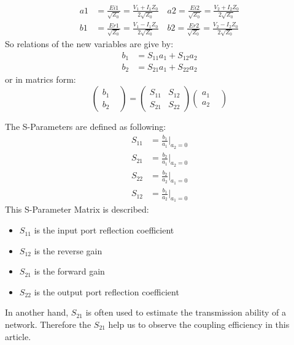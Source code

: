 \begin{align} 
a1&=\frac{Ei1}{\sqrt{Z_{0}}}=\frac{V_{1}+I_{1}Z_{0}}{2\sqrt{Z_{0}}} \quad a2=\frac{Ei2}{\sqrt{Z_{0}}}=\frac{V_{2}+I_{2}Z_{0}}{2\sqrt{Z_{0}}} \\
b1&=\frac{Er1}{\sqrt{Z_{0}}}=\frac{V_{1}-I_{1}Z_{0}}{2\sqrt{Z_{0}}}  \quad b2=\frac{Er2}{\sqrt{Z_{0}}}=\frac{V_{2}-I_{2}Z_{0}}{2\sqrt{Z_{0}}}
\end{align}
So relations of the new variables are give by:
\begin{align}
b_{1}&=S_{11}a_{1}+S_{12}a_{2}\\
b_{2}&=S_{21}a_{1}+S_{22}a_{2}
\end{align}
or in matrics form:
\begin{equation}
		\begin{pmatrix}
			b_{1}&\\
			b_{2}&
		\end{pmatrix}
	=	
		\begin{pmatrix}
			S_{11}&S_{12}\\
			S_{21}&S_{22}
		\end{pmatrix}
		\begin{pmatrix}
			a_{1}&\\
			a_{2}&
		\end{pmatrix}
\label{eq:s_matrix}
\end{equation}

The S-Parameters are defined as following:
\begin{align}
S_{11}&=\frac{b_{1}}{a_{1}}|_{a_{2}=0}\\
S_{21}&=\frac{b_{2}}{a_{1}}|_{a_{2}=0}\\
S_{22}&=\frac{b_{2}}{a_{2}}|_{a_{1}=0}\\
S_{12}&=\frac{b_{1}}{a_{2}}|_{a_{1}=0}
\end{align}
This S-Parameter Matrix is described:
\begin{itemize}
\item $S_{11}$ is the input port reflection coefficient
\item $S_{12}$ is the reverse gain
\item $S_{21}$ is the forward gain
\item $S_{22}$ is the output port reflection coefficient
\end{itemize}
In another hand, $S_{21}$ is often used to estimate the transmission ability of a network. Therefore the $S_{21}$ help us to observe the coupling efficiency in this article.
